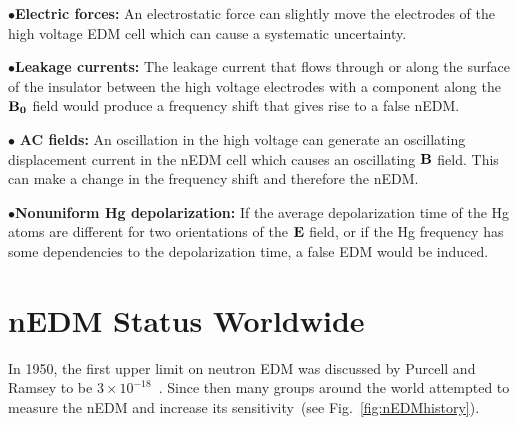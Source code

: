 \begin{description}
\item{$\bullet$\bf{Electric forces:}} An electrostatic force can
  slightly move the electrodes of the high voltage EDM cell which can
  cause a systematic uncertainty.

\item{$\bullet$\bf{Leakage currents:}} The leakage current that flows
  through or along the surface of the insulator between the high
  voltage electrodes with a component along the $\bf{B_0}$ field would
  produce a frequency shift that gives rise to a false nEDM.

\item{$\bullet$ \bf{AC fields:}} An oscillation in the high voltage
  can generate an oscillating displacement current in the nEDM cell
  which causes an oscillating $\bf{B}$ field. This can make a change
  in the frequency shift and therefore the nEDM.

\item{$\bullet$\bf{Nonuniform Hg depolarization:}} If the average
  depolarization time of the Hg atoms are different for two
  orientations of the $\bf{E}$ field, or if the Hg frequency has some
  dependencies to the depolarization time, a false EDM would be
  induced.

\end{description}





\section{nEDM Status Worldwide}
In 1950, the first upper limit on neutron EDM was discussed by Purcell
and Ramsey to be $3 \times 10^{-18}$~\cite{PhysRev.78.807}. Since then
many groups around the world attempted to measure the nEDM and
increase its sensitivity~(see Fig.~\ref{fig:nEDMhistory}).

